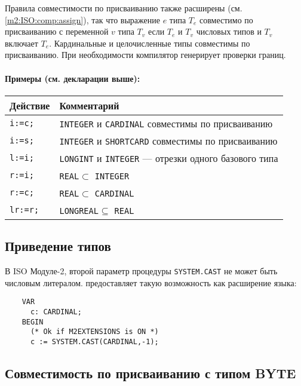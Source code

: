Правила совместимости по присваиванию также расширены
(см. \ref{m2:ISO:comp:assign}),  так что выражение $e$ типа $T_e$
совместимо по присваиванию с переменной $v$ типа $T_v$ если $T_e$
и $T_v$ числовых типов и $T_v$ включает $T_e$. 
Кардинальные и целочисленные типы совместимы по присваиванию.
При необходимости компилятор генерирует проверки границ.

\paragraph{Примеры (см. декларации выше):}
\begin{center}
\begin{tabular}{|l|p{7cm}|} \hline
\bf Действие &\bf Комментарий \\ \hline
\tt i:=c;     & {\tt INTEGER} и {\tt CARDINAL} совместимы по присваиванию \\
\tt i:=s;     & {\tt INTEGER} и {\tt SHORTCARD} совместимы по присваиванию \\
\tt l:=i;     & {\tt LONGINT} и {\tt INTEGER} --- отрезки одного базового типа                                              \\
\tt r:=i;     & {\tt REAL}$\subset$ {\tt INTEGER}                           \\
\tt r:=c;     & {\tt REAL}$\subset$ {\tt CARDINAL}                          \\
\tt lr:=r;    & {\tt LONGREAL}$\subseteq$ {\tt REAL}                          \\
\hline
\end{tabular}
\end{center}

\subsection{Приведение типов}

\mextonly

В ISO Модуле-2, второй параметр процедуры
\verb'SYSTEM.CAST' не может быть числовым литералом.
\XDS{} предоставляет такую возможность как расширение языка:

\begin{verbatim}
    VAR
      c: CARDINAL;
    BEGIN
      (* Ok if M2EXTENSIONS is ON *)
      c := SYSTEM.CAST(CARDINAL,-1); 
\end{verbatim}

\subsection{Совместимость по присваиванию с типом BYTE}

